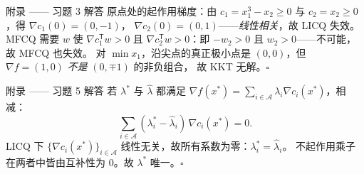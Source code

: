 \documentclass[aspectratio=169,10pt]{beamer}
\newcommand{\Aset}{\mathcal{A}}
\newcommand{\grad}{\nabla}
\newcommand{\T}{^{\mathsf{T}}}
\newcommand{\xs}{x^{*}}
\newcommand{\ls}{\lambda^{*}}
\begin{document}
\begin{frame}{附录 —— 习题 3 解答}
  原点处的起作用梯度：由 $c_1=x_1^3-x_2\ge0$ 与 $c_2=x_2\ge0$，得 $\grad c_1(0)=(0,-1)$，
  $\grad c_2(0)=(0,1)$——\emph{线性相关}，故 LICQ 失效。MFCQ 需要 $w$ 使
  $\grad c_1\T w>0$ 且 $\grad c_2\T w>0$：即 $-w_2>0$ 且 $w_2>0$——不可能，故 MFCQ 也失效。
  对 $\min x_1$，沿尖点的真正极小点是 $(0,0)$，但 $\grad f=(1,0)$ \emph{不是} $(0,\mp1)$ 的非负组合，
  故 KKT 无解。\hfill$\square$
\end{frame}

\begin{frame}{附录 —— 习题 5 解答}
  若 $\ls$ 与 $\hat\lambda$ 都满足 $\grad f(\xs)=\sum_{i\in\Aset}\lambda_i\grad c_i(\xs)$，相减：
  \[ \sum_{i\in\Aset}(\lambda_i^{*}-\hat\lambda_i)\,\grad c_i(\xs)=0. \]
  LICQ 下 $\{\grad c_i(\xs)\}_{i\in\Aset}$ 线性无关，故所有系数为零：$\lambda_i^{*}=\hat\lambda_i$。
  不起作用乘子在两者中皆由互补性为 $0$。故 $\ls$ 唯一。\hfill$\square$
\end{frame}
\end{document}
